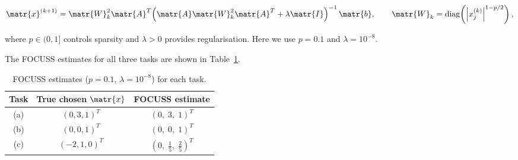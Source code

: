 \begin{equation*}
  \matr{x}^{(k+1)}
  = \matr{W}_k^2 \matr{A}^T
    \!\left(\matr{A}\matr{W}_k^2\matr{A}^T + \lambda\matr{I}\right)^{-1}
    \matr{b},
  \qquad
  \matr{W}_k = \operatorname{diag}\!\left(\left|x_j^{(k)}\right|^{1-p/2}\right),
\end{equation*}

\noindent where $p\in(0,1]$ controls sparsity and $\lambda>0$ provides
regularisation.
Here we use $p=0.1$ and $\lambda=10^{-8}$.



The FOCUSS estimates for all three tasks are shown in Table~\ref{tab:focuss_p1}.

\begin{table}[h]
  \centering
  \begin{tabular}{ccc}
    \hline
    Task & True chosen $\matr{x}$ & FOCUSS estimate \\
    \hline
    (a) & $(0,3,1)^T$ & $(0,\;3,\;1)^T$ \\
    (b) & $(0,0,1)^T$ & $(0,\;0,\;1)^T$ \\
    (c) & $(-2,1,0)^T$ & $(0,\;\tfrac{1}{5},\;\tfrac{2}{5})^T$ \\
    \hline
  \end{tabular}
  \caption{FOCUSS estimates ($p=0.1$, $\lambda=10^{-8}$) for each task.}
  \label{tab:focuss_p1}
\end{table}
